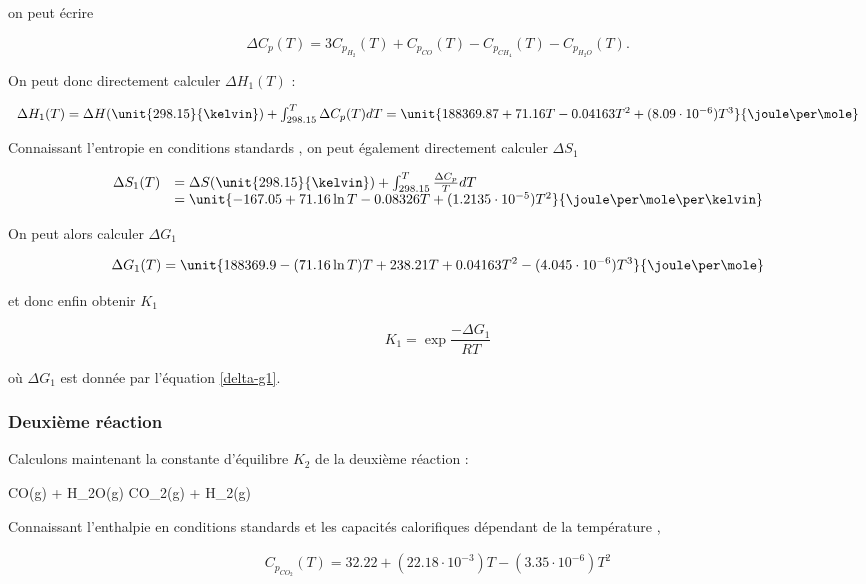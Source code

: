on peut écrire

$$\Delta C_p(T) = 3C_{p_{H_2}}(T) + C_{p_{CO}}(T) - C_{p_{CH_{4}}}(T) - C_{p_{H_2O}}(T).$$

On peut donc directement calculer $\Delta H_1(T)$ :

$$
	\begin{array}{rl}
		 	 \Delta H_1(T)	= \Delta H(\unit{298.15}{\kelvin}) + \int_{298.15}^T \Delta C_p(T) dT 
											= \unit{188369.87 + 71.16 T -0.04163 T^2 + (8.09\cdot 10^{-6}) T^3}{\joule\per\mole} 
	\end{array}
$$	

Connaissant l'entropie en conditions standards \cite{atkins}, on peut 
également directement calculer $\Delta S_1$
 
$$
	\begin{array}{rl}
		 	 \Delta S_1(T)	&=  \Delta S(\unit{298.15}{\kelvin}) + \int_{298.15}^{T} \frac{\Delta C_p}{T}dT \\
											&= \unit{-167.05 + 71.16 \ln T -0.08326 T + (1.2135\cdot 10^{-5}) T^2}{\joule\per\mole\per\kelvin}
	\end{array}
$$	

On peut alors calculer $\Delta G_1$
 
 \begin{equation}
	\Delta G_1(T) = \unit{188369.9 - (71.16\ln T)T + 238.21T + 0.04163 T^2 -(4.045\cdot 10^{-6})T^3}{\joule\per\mole}
	\label{delta-g1}
 \end{equation} 

et donc enfin obtenir $K_1$

$$K_1 = \exp{\frac{-\Delta G_1}{RT}}$$

où $\Delta G_1$ est donnée par l'équation \ref{delta-g1}.

\subsubsection{Deuxième réaction}
Calculons maintenant la constante d'équilibre $K_2$ de la deuxième réaction :

\begin{chemmath} 
	CO(g) + H_2O(g) \Leftrightarrow CO_2(g) + H_2(g)
\end{chemmath} 

Connaissant l'enthalpie en conditions standards \cite{atkins} et les capacités calorifiques dépendant de la température \cite{hc-table},

$$
	\begin{array}{rl}
		C_{p_{CO_2}}(T)=32.22 +(22.18 \cdot 10^{-3})T - (3.35 \cdot 10^{-6})T^2\\
	\end{array}
$$

